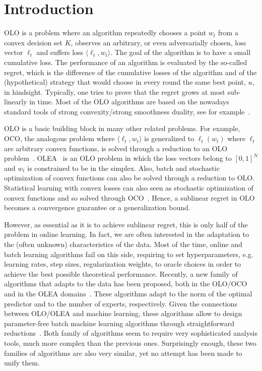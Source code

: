 \section{Introduction}
\label{section:introduction}

\ac{OLO} is a problem where an algorithm repeatedly chooses a point $w_t$ from
a convex decision set $K$, observes an arbitrary, or even adversarially chosen,
loss vector $\ell_t$ and suffers loss $\langle \ell_t, w_t \rangle$. The goal
of the algorithm is to have a small cumulative loss. The performance of an
algorithm is evaluated by the so-called regret, which is the difference of the
cumulative losses of the algorithm and of the (hypothetical) strategy that
would choose in every round the same best point, $u$, in hindsight. Typically,
one tries to prove that the regret grows at most sub-linearly in time. Most of
the \ac{OLO} algorithms are based on the nowadays standard tools of strong
convexity/strong smoothness duality, see for example~\citet{OrabonaCCB15}.

\ac{OLO} is a basic building block in many other related problems. For example,
\ac{OCO}, the analogous problem where $\langle \ell_t, w_t \rangle$ is
generalized to $\ell_t(w_t)$ where $\ell_t$ are arbitrary convex functions, is
solved through a reduction to an \ac{OLO}
problem~\citep{Cesa-BianchiL06,Shalev-Shwartz12}.
\ac{OLEA}~\citep{LittlestoneW94,Vovk98,Cesa-BianchiFHHSW97} is an \ac{OLO}
problem in which the loss vectors belong to $[0,1]^N$ and $w_t$ is constrained
to be in the simplex. Also, batch and stochastic optimization of convex
functions can also be solved through a reduction to \ac{OLO}. Statistical
learning with convex losses can also seen as stochastic optimization of convex
functions and so solved through \ac{OCO}~\citep{Munro1951}. Hence, a sublinear
regret in \ac{OLO} becomes a convergence guarantee or a generalization bound.

However, as essential as it is to achieve sublinear regret, this is only half
of the problem in online learning. In fact, we are often interested in the
adaptation to the (often unknown) characteristics of the data. Most of the
time, online and batch learning algorithms fail on this side, requiring to set
hyperparameters, e.g. learning rates, step sizes, regularization weights, to
oracle choices in order to achieve the best possible theoretical performance.
Recently, a new family of algorithms that adapts to the data has been proposed,
both in the
\ac{OLO}/\ac{OCO}~\citep{StreeterM12,Orabona13,McMahanA13,McMahanO14,Orabona14}
and in the \ac{OLEA}
domains~\citep{ChaudhuriYH09,ChernovV10,LuoE14,LuoS15,KoolenE15}. These
algorithms adapt to the norm of the optimal predictor and to the number of
experts, respectively. Given the connections between \ac{OLO}/\ac{OLEA} and
machine learning, these algorithms allow to design parameter-free batch machine
learning algorithms through straightforward
reductions~\citep{Orabona14,LuoS15}. Both family of algorithms seem to require
very sophisticated analysis tools, much more complex than the previous ones.
Surprisingly enough, these two families of algorithms are also very similar,
yet no attempt has been made to unify them.

